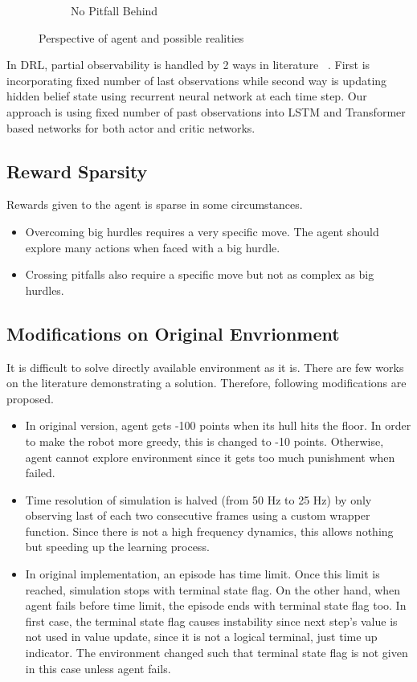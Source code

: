 \begin{figure}
\begin{subfigure}{.32\textwidth}
		\caption{No Pitfall Behind}
		\label{fig:no_pitfall_behind}
	\end{subfigure}
	\caption{Perspective of agent and possible realities}
	\label{fig:partial_obs_pitfall}
\end{figure}

In DRL, partial observability is handled by 2 ways in literature~ \cite{dulac-arnold_challenges_2019}. 
First is incorporating fixed number of last observations while second way is updating hidden belief state using recurrent neural network at each time step. 
Our approach is using fixed number of past observations into LSTM and Transformer based networks for both actor and critic networks. 

\subsection{Reward Sparsity}

Rewards given to the agent is sparse in some circumstances. 
\begin{itemize}
	\item Overcoming big hurdles requires a very specific move. 
	The agent should explore many actions when faced with a big hurdle.
	\item Crossing pitfalls also require a specific move but not as complex as big hurdles.
\end{itemize}

\subsection{Modifications on Original Envrionment}

It is difficult to solve directly available environment as it is. 
There are few works on the literature demonstrating a solution. 
Therefore, following modifications are proposed.

\begin{itemize}
	\item In original version, agent gets -100 points when its hull hits the floor. 
	In order to make the robot more greedy, this is changed to -10 points. 
	Otherwise, agent cannot explore environment since it gets too much punishment when failed.
	\item Time resolution of simulation is halved (from 50 Hz to 25 Hz) by only observing last of each two consecutive frames using a custom wrapper function. 
	Since there is not a high frequency dynamics, this allows nothing but speeding up the learning process.
	\item In original implementation, an episode has time limit. 
	Once this limit is reached, simulation stops with terminal state flag. 
	On the other hand, when agent fails before time limit, the episode ends with terminal state flag too. 
	In first case, the terminal state flag causes instability since next step's value is not used in value update, since it is not a logical terminal, just time up indicator.
	The environment changed such that terminal state flag is not given in this case unless agent fails. 
\end{itemize}


